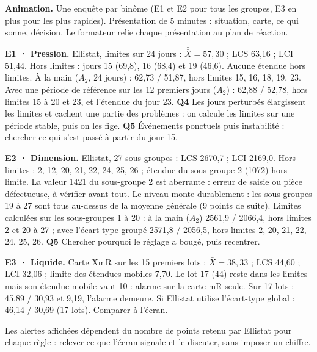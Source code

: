 \documentclass[10pt,a4paper]{article}
\begin{document}
\textbf{Animation.} Une enquête par binôme (E1 et E2 pour tous les groupes, E3 en plus pour les plus rapides). Présentation de 5 minutes : situation, carte, ce qui sonne, décision. Le formateur relie chaque présentation au plan de réaction.
\begin{tcolorbox}[corr]
\textbf{E1 · Pression.} Ellistat, limites sur 24 jours : $\bar{\bar X} = 57{,}30$ ; LCS 63,16 ; LCI 51,44. Hors limites : jours 15 (69,8), 16 (68,4) et 19 (46,6). Aucune étendue hors limites. À la main ($A_2$, 24 jours) : 62,73 / 51,87, hors limites 15, 16, 18, 19, 23. Avec une période de référence sur les 12 premiers jours ($A_2$) : 62,88 / 52,78, hors limites 15 à 20 et 23, et l'étendue du jour 23. \textbf{Q4} Les jours perturbés élargissent les limites et cachent une partie des problèmes : on calcule les limites sur une période stable, puis on les fige. \textbf{Q5} Événements ponctuels puis instabilité : chercher ce qui s'est passé à partir du jour 15.

\textbf{E2 · Dimension.} Ellistat, 27 sous-groupes : LCS 2670,7 ; LCI 2169,0. Hors limites : 2, 12, 20, 21, 22, 24, 25, 26 ; étendue du sous-groupe 2 (1072) hors limite. La valeur 1421 du sous-groupe 2 est aberrante : erreur de saisie ou pièce défectueuse, à vérifier avant tout. Le niveau monte durablement : les sous-groupes 19 à 27 sont tous au-dessus de la moyenne générale (9 points de suite). Limites calculées sur les sous-groupes 1 à 20 : à la main ($A_2$) 2561,9 / 2066,4, hors limites 2 et 20 à 27 ; avec l'écart-type groupé 2571,8 / 2056,5, hors limites 2, 20, 21, 22, 24, 25, 26. \textbf{Q5} Chercher pourquoi le réglage a bougé, puis recentrer.

\textbf{E3 · Liquide.} Carte XmR sur les 15 premiers lots : $\bar X = 38{,}33$ ; LCS 44,60 ; LCI 32,06 ; limite des étendues mobiles 7,70. Le lot 17 (44) reste dans les limites mais son étendue mobile vaut 10 : alarme sur la carte mR seule. Sur 17 lots : 45,89 / 30,93 et 9,19, l'alarme demeure. Si Ellistat utilise l'écart-type global : 46,14 / 30,69 (17 lots). Comparer à l'écran.
\end{tcolorbox}
{\small Les alertes affichées dépendent du nombre de points retenu par Ellistat pour chaque règle : relever ce que l'écran signale et le discuter, sans imposer un chiffre.}
\end{document}
